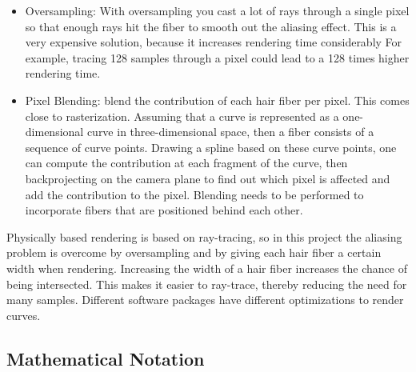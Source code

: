 \documentclass[11pt,a4paper]{report}
\begin{document}
\begin{itemize}
\item Oversampling: With oversampling you cast a lot of rays through a single pixel so that enough rays hit the fiber to smooth out the aliasing effect. This is a very expensive solution, because it increases rendering time considerably For example, tracing 128 samples through a pixel could lead to a 128 times higher rendering time.



\item Pixel Blending: blend the contribution of each hair fiber per pixel. This comes close to rasterization. Assuming that a curve is represented as a one-dimensional curve in three-dimensional space, then a fiber consists of a sequence of curve points. Drawing a spline based on these curve points, one can compute the contribution at each fragment of the curve, then backprojecting on the camera plane to find out which pixel is affected and add the contribution to the pixel. Blending needs to be performed to incorporate fibers that are positioned behind each other.

\end{itemize}

Physically based rendering is based on ray-tracing, so in this project the aliasing problem is overcome by oversampling and by giving each hair fiber a certain width when rendering. Increasing the width of a hair fiber increases the chance of being intersected. This makes it easier to ray-trace, thereby reducing the need for many samples. Different software packages have different optimizations to render curves.

\subsection{Mathematical Notation}
\label{sec_mathematical_notation}
\end{document}
